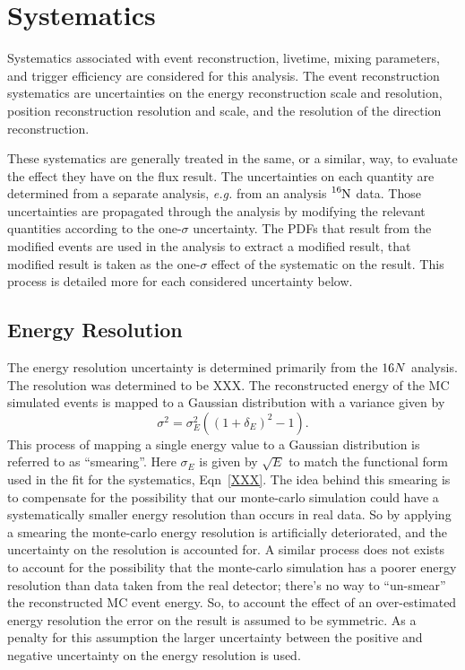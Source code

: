 \section{Systematics}
Systematics associated with event reconstruction, livetime, mixing parameters,
and trigger efficiency are considered for this analysis.
The event reconstruction systematics are uncertainties on the energy reconstruction
scale and resolution, position reconstruction resolution and scale, and the
resolution of the direction reconstruction.

These systematics are generally treated in the same, or a similar, way, to evaluate
the effect they have on the flux result.
The uncertainties on each quantity are determined from a separate analysis, \textit{e.g.}
from an analysis $\ce{^{16}N}$ data.
Those uncertainties are propagated through the analysis by modifying the relevant quantities
according to the one-$\sigma$ uncertainty.
The PDFs that result from the modified events are used in the analysis to extract
a modified result, that modified result is taken as the one-$\sigma$ effect of the
systematic on the result.
This process is detailed more for each considered uncertainty below.

\subsection{Energy Resolution}
The energy resolution uncertainty is determined primarily from the $\ce{16}N$ analysis.
The resolution was determined to be XXX. %
The reconstructed energy of the MC simulated events is mapped to a Gaussian distribution with a variance given
by
\begin{equation}
  \sigma^{2} = \sigma_{E}^{2}\left(\left(1 + \delta_{E}\right)^2 - 1\right)\text{.}
  \label{eqn:systmatic_esmear}
\end{equation}
This process of mapping a single energy value to a Gaussian distribution is referred to as ``smearing''.
Here $\sigma_{E}$ is given by $\sqrt{E}$ to match the functional form used in the fit for the systematics,
Eqn~\ref{XXX}.
The idea behind this smearing is to compensate for the possibility that our monte-carlo simulation could have
a systematically smaller energy resolution than occurs in real data.
So by applying a smearing the monte-carlo energy resolution is artificially deteriorated, and the uncertainty
on the resolution is accounted for.
A similar process does not exists to account for the possibility that the monte-carlo simulation has a poorer
energy resolution than data taken from the real detector; there's no way to ``un-smear'' the reconstructed MC
event energy.
So, to account the effect of an over-estimated energy resolution the error on the result is assumed to be symmetric.
As a penalty for this assumption the larger uncertainty between the positive and negative uncertainty on the
energy resolution is used.

